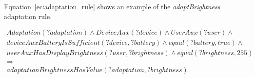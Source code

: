 Equation~\ref{ec:adaptation_rule} shows an example of the \textit{adaptBrightness} 
adaptation rule.

\footnotesize
\begin{equation} \label{ec:adaptation_rule}
  \begin{align*} 
  Adaptation(?adaptation) ∧ DeviceAux(?device) ∧ UserAux(?user) ∧ \\
  deviceAuxBatteryIsSufficient(?device, ?battery) ∧ equal(?battery, true) ∧ \\
  userAuxHasDisplayBrightness(?user, ?brightness) ∧ equal(?brightness, 255)\\ 
  \Rightarrow \\
  adaptationBrightnessHasValue(?adaptation, ?brightness)\\
  \end{align*}
\end{equation}
\normalsize



